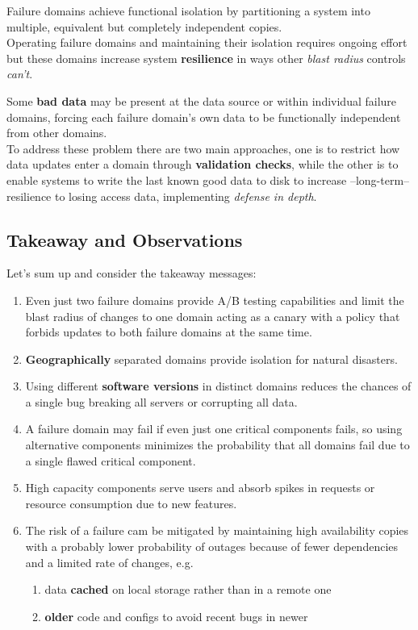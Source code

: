 Failure domains achieve functional isolation by partitioning a system into multiple,
equivalent but completely independent copies.\\
Operating failure domains and maintaining their isolation requires ongoing effort but
these domains increase system \textbf{resilience} in ways other \textit{blast radius} controls \textit{can’t}.

Some \textbf{bad data} may be present at the data source or within individual failure domains,
forcing each failure domain's own data to be functionally independent from other domains.\\
To address these problem there are two main approaches, one is to restrict how data updates enter a domain through \textbf{validation checks},
while the other is to enable systems to write the last known good data to disk to increase {--}long-term{--}resilience to losing access data, implementing \textit{defense in depth}.

\subsection{Takeaway and Observations}

Let's sum up and consider the takeaway messages:
\begin{enumerate}
   \item Even just two failure domains provide A/B testing capabilities and limit the blast
   radius of changes to one domain acting as a canary with a policy that forbids
   updates to both failure domains at the same time.
   \item \textbf{Geographically} separated domains provide isolation for natural disasters.
   \item Using different \textbf{software versions} in distinct domains reduces the chances of a
   single bug breaking all servers or corrupting all data.
   \item A failure domain may fail if even just one critical components fails, so using alternative components minimizes the probability that all domains fail due to a single flawed critical component.
   \item High capacity components serve users and absorb spikes in requests or resource consumption due to new features.
   \item The risk of a failure cam be mitigated by maintaining high availability copies with a probably lower probability of outages because of fewer dependencies and a limited rate of
   changes, e.g.
   \begin{enumerate}
      \item data \textbf{cached} on local storage rather than in a remote one
      \item \textbf{older} code and configs to avoid recent bugs in newer
   \end{enumerate}
\end{enumerate}

